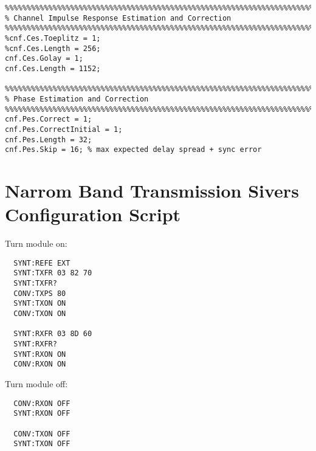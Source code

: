 \begin{appendix}
\begin{verbatim}
%%%%%%%%%%%%%%%%%%%%%%%%%%%%%%%%%%%%%%%%%%%%%%%%%%%%%%%%%%%%%%%%%%%%%%%%%%%%%%%%
% Channel Impulse Response Estimation and Correction
%%%%%%%%%%%%%%%%%%%%%%%%%%%%%%%%%%%%%%%%%%%%%%%%%%%%%%%%%%%%%%%%%%%%%%%%%%%%%%%%
%cnf.Ces.Toeplitz = 1;
%cnf.Ces.Length = 256;
cnf.Ces.Golay = 1;
cnf.Ces.Length = 1152;

%%%%%%%%%%%%%%%%%%%%%%%%%%%%%%%%%%%%%%%%%%%%%%%%%%%%%%%%%%%%%%%%%%%%%%%%%%%%%%%%
% Phase Estimation and Correction
%%%%%%%%%%%%%%%%%%%%%%%%%%%%%%%%%%%%%%%%%%%%%%%%%%%%%%%%%%%%%%%%%%%%%%%%%%%%%%%%
cnf.Pes.Correct = 1;
cnf.Pes.CorrectInitial = 1;
cnf.Pes.Length = 32;
cnf.Pes.Skip = 16; % max expected delay spread + sync error
\end{verbatim}

\chapter{Narrom Band Transmission Sivers Configuration Script}
\label{app:res_450_sivers_on}
Turn module on:

\begin{verbatim}
  SYNT:REFE EXT
  SYNT:TXFR 03 82 70
  SYNT:TXFR?
  CONV:TXPS 80
  SYNT:TXON ON
  CONV:TXON ON

  SYNT:RXFR 03 8D 60
  SYNT:RXFR?
  SYNT:RXON ON
  CONV:RXON ON
\end{verbatim}

Turn module off:
\begin{verbatim}
  CONV:RXON OFF
  SYNT:RXON OFF

  CONV:TXON OFF
  SYNT:TXON OFF
\end{verbatim}

\end{appendix}
